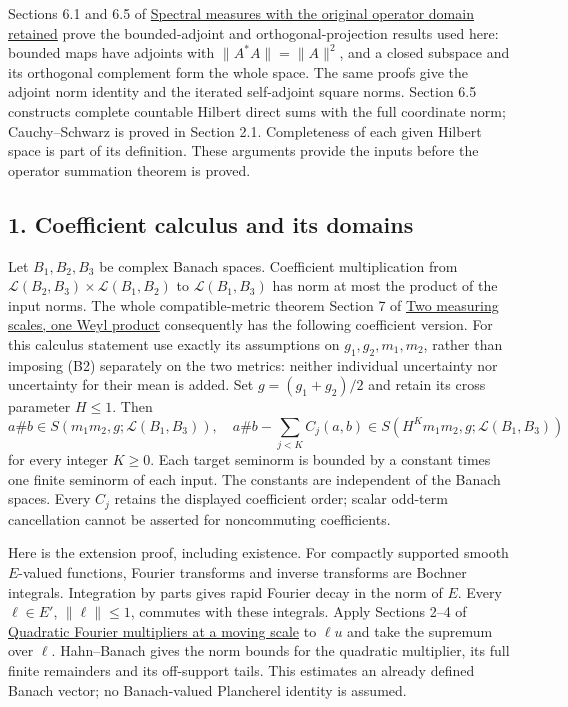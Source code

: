 \documentclass[
  11pt,
]{article}
\begin{document}
Sections 6.1 and 6.5 of
\href{lower-bounded-spectral-calculus.pdf}{Spectral measures with the
original operator domain retained} prove the bounded-adjoint and
orthogonal-projection results used here: bounded maps have adjoints with
\(\|A^*A\|=\|A\|^2\), and a closed subspace and its orthogonal
complement form the whole space. The same proofs give the adjoint norm
identity and the iterated self-adjoint square norms. Section 6.5
constructs complete countable Hilbert direct sums with the full
coordinate norm; Cauchy--Schwarz is proved in Section 2.1. Completeness
of each given Hilbert space is part of its definition. These arguments
provide the inputs before the operator summation theorem is proved.

\subsection{1. Coefficient calculus and its
domains}\label{coefficient-calculus-and-its-domains}

Let \(B_1,B_2,B_3\) be complex Banach spaces. Coefficient multiplication
from \(\mathcal L(B_2,B_3)\times\mathcal L(B_1,B_2)\) to
\(\mathcal L(B_1,B_3)\) has norm at most the product of the input norms.
The whole compatible-metric theorem Section 7 of
\href{weyl-metric-products.pdf}{Two measuring scales, one Weyl product}
consequently has the following coefficient version. For this calculus
statement use exactly its assumptions on \(g_1,g_2,m_1,m_2\), rather
than imposing (B2) separately on the two metrics: neither individual
uncertainty nor uncertainty for their mean is added. Set
\(g=(g_1+g_2)/2\) and retain its cross parameter \(H\le1\). Then \[
 a\# b\in S(m_1m_2,g;\mathcal L(B_1,B_3)),
 \quad
 a\# b-\sum_{j<K}C_j(a,b)
 \in S(H^K m_1m_2,g;\mathcal L(B_1,B_3))
 \tag{B5}
\] for every integer \(K\ge0\). Each target seminorm is bounded by a
constant times one finite seminorm of each input. The constants are
independent of the Banach spaces. Every \(C_j\) retains the displayed
coefficient order; scalar odd-term cancellation cannot be asserted for
noncommuting coefficients.

Here is the extension proof, including existence. For compactly
supported smooth \(E\)-valued functions, Fourier transforms and inverse
transforms are Bochner integrals. Integration by parts gives rapid
Fourier decay in the norm of \(E\). Every \(\ell\in E'\),
\(\|\ell\|\le1\), commutes with these integrals. Apply Sections 2--4 of
\href{gauss-transform-estimates.pdf}{Quadratic Fourier multipliers at a
moving scale} to \(\ell u\) and take the supremum over \(\ell\).
Hahn--Banach gives the norm bounds for the quadratic multiplier, its
full finite remainders and its off-support tails. This estimates an
already defined Banach vector; no Banach-valued Plancherel identity is
assumed.
\end{document}
